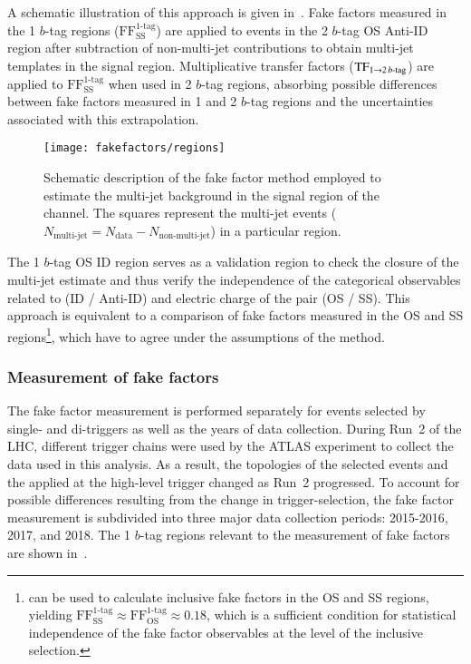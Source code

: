 A schematic illustration of this approach is given
in~. Fake factors measured in the 1
$b$-tag regions ($\text{FF}_\text{SS}^\text{1-tag}$) are applied to
events in the 2 $b$-tag OS Anti-ID region after subtraction of
non-multi-jet contributions to obtain multi-jet templates in the
signal region. Multiplicative transfer factors
($\text{TF}_{1 \rightarrow 2\,b\text{-tag}}$) are applied to
$\text{FF}_\text{SS}^\text{1-tag}$ when used in 2 $b$-tag regions,
absorbing possible differences between fake factors measured in 1 and
2 $b$-tag regions and the uncertainties associated with this
extrapolation.

\begin{figure}[htbp]
  \centering

  \texttt{[image: fakefactors/regions]}

  \caption{Schematic description of the fake factor method employed to
    estimate the multi-jet background in the signal region of the
    \hadhad channel. The squares represent the multi-jet events
    ($N_\text{multi-jet} = N_\text{data} - N_\text{non-multi-jet}$) in
    a particular region.}
  \label{fig:fakefactor_regions}
\end{figure}

The 1 $b$-tag OS ID region serves as a validation region to check the
closure of the multi-jet estimate and thus verify the independence of
the categorical observables related to \tauid (ID / Anti-ID) and
electric charge of the \tauhadvis pair (OS / SS). This approach is
equivalent to a comparison of
fake factors measured in the OS and SS
regions\footnote{ can be used to
  calculate inclusive fake factors in the OS and SS regions, yielding
  $\text{FF}_\text{SS}^\text{1-tag} \approx
  \text{FF}_\text{OS}^\text{1-tag} \approx 0.18$, which is a
  sufficient condition for statistical independence of the fake factor
  observables at the level of the inclusive selection.}, which have to
agree under the assumptions of the method.


\subsubsection{Measurement of fake factors}

The fake factor measurement is performed separately for events
selected by single- and di-\tauhadvis triggers as well as the years of
data collection. During Run~2 of the LHC, different \tauhadvis trigger
chains were used by the ATLAS experiment to collect the data used in
this analysis. As a result, the topologies of the selected events and
the \tauid applied at the high-level trigger changed as Run~2
progressed. To account for possible differences resulting from the
change in trigger-selection, the fake factor measurement is subdivided
into three major data collection periods: 2015-2016, 2017, and
2018. The 1 $b$-tag regions relevant to the measurement of fake
factors are shown in~.

